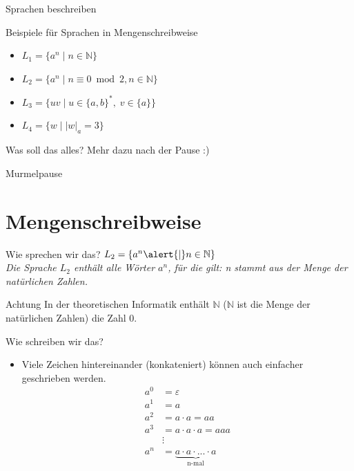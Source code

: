 \documentclass[10pt]{beamer}
\newcommand{\emptyWord}{\varepsilon}
\begin{document}
\begin{frame}[fragile]{Sprachen beschreiben}
    \begin{exampleblock}{Beispiele für Sprachen in Mengenschreibweise}
    \begin{itemize}
        \item $L_1 = \{a^n\;|\;n\in\mathbb{N}\}$
        \item $L_2 = \{a^n\;|\;n \equiv 0 \bmod 2, n\in\mathbb{N}\}$
        \item $L_3 = \{uv\;|\;u\in\{a,b\}^\ast,\;v\in\{a\}\}$
        \item $L_4 = \{w\;|\;|w|_a = 3\}$
    \end{itemize}
    \end{exampleblock}
    Was soll das alles? Mehr dazu nach der Pause :)
\end{frame}

\begin{frame}[standout]
  Murmelpause
\end{frame}

\section{Mengenschreibweise} 



\begin{frame}[fragile]{Wie sprechen wir das?}
$L_2 = \{a^n \alert{\mid} n \in \mathbb{N}\}$ \\

\emph{Die Sprache $L_2$ enthält alle Wörter $a^n$, \alert{für die gilt}: n stammt aus der Menge der natürlichen Zahlen.}
\vspace{5pt}

\begin{alertblock}{Achtung}
    In der theoretischen Informatik enthält $\mathbb{N}$ ($\mathbb{N}$ ist die Menge der natürlichen Zahlen) die Zahl 0.
\end{alertblock}

\end{frame}

\begin{frame}[fragile]{Wie schreiben wir das?}
    \begin{itemize}
        \item
        Viele Zeichen hintereinander (konkateniert) können auch einfacher geschrieben werden.
        \begin{align*}
            a^0 &= \emptyWord\\
            a^1 &= a\\
            a^2 &= a \cdot a = aa\\
            a^3 &= a \cdot a \cdot a = aaa\\
            &\vdots\\
            a^n &= \underbrace{a \cdot a \cdot ... \cdot a}_{\text{n-mal}}
        \end{align*}
        
        \end{itemize}
\end{frame}
\end{document}
